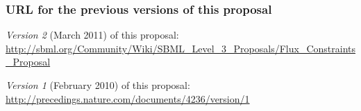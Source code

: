 \documentclass[draftspec]{sbmlpkgspec}
\begin{document}
\subsubsection{ URL for the previous versions of this proposal }
\textit{Version 2} (March 2011) of this proposal: \url{http://sbml.org/Community/Wiki/SBML_Level_3_Proposals/Flux_Constraints_Proposal}

\noindent\textit{Version 1} (February 2010) of this
proposal: \url{http://precedings.nature.com/documents/4236/version/1}









\setcounter{secnumdepth}{2}
\appendix
%

\setcounter{secnumdepth}{-1}


\clearpage

\end{document}
